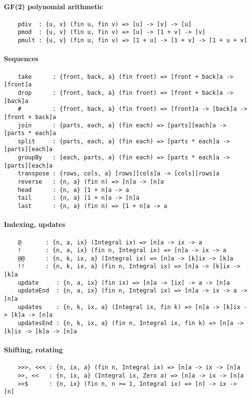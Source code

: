 \paragraph*{GF(2) polynomial arithmetic}
\begin{Verbatim}
    pdiv  : {u, v} (fin u, fin v) => [u] -> [v] -> [u]
    pmod  : {u, v} (fin u, fin v) => [u] -> [1 + v] -> [v]
    pmult : {u, v} (fin u, fin v) => [1 + u] -> [1 + v] -> [1 + u + v]
\end{Verbatim}
\paragraph*{Sequences}
\begin{Verbatim}
    take      : {front, back, a} (fin front) => [front + back]a -> [front]a
    drop      : {front, back, a} (fin front) => [front + back]a -> [back]a
    #         : {front, back, a} (fin front) => [front]a -> [back]a -> [front + back]a
    join      : {parts, each, a} (fin each) => [parts][each]a -> [parts * each]a
    split     : {parts, each, a} (fin each) => [parts * each]a -> [parts][each]a
    groupBy   : {each, parts, a} (fin each) => [parts * each]a -> [parts][each]a
    transpose : {rows, cols, a} [rows][cols]a -> [cols][rows]a
    reverse   : {n, a} (fin n) => [n]a -> [n]a
    head      : {n, a} [1 + n]a -> a
    tail      : {n, a} [1 + n]a -> [n]a
    last      : {n, a} (fin n) => [1 + n]a -> a
\end{Verbatim}
\paragraph*{Indexing, updates}
\begin{Verbatim}
    @       : {n, a, ix} (Integral ix) => [n]a -> ix -> a
    !       : {n, a, ix} (fin n, Integral ix) => [n]a -> ix -> a
    @@      : {n, k, ix, a} (Integral ix) => [n]a -> [k]ix -> [k]a
    !!      : {n, k, ix, a} (fin n, Integral ix) => [n]a -> [k]ix -> [k]a
    update     : {n, a, ix} (fin ix) => [n]a -> [ix] -> a -> [n]a
    updateEnd  : {n, a, ix} (fin n, Integral ix) => [n]a -> ix -> a -> [n]a
    updates    : {n, k, ix, a} (Integral ix, fin k) => [n]a -> [k]ix -> [k]a -> [n]a
    updatesEnd : {n, k, ix, a} (fin n, Integral ix, fin k) => [n]a -> [k]ix -> [k]a -> [n]a
\end{Verbatim}
\paragraph*{Shifting, rotating}
\begin{Verbatim}
    >>>, <<< : {n, ix, a} (fin n, Integral ix) => [n]a -> ix -> [n]a
    >>, <<   : {n, ix, a} (Integral ix, Zero a) => [n]a -> ix -> [n]a
    >>$      : {n, ix} (fin n, n >= 1, Integral ix) => [n] -> ix -> [n]
\end{Verbatim}
